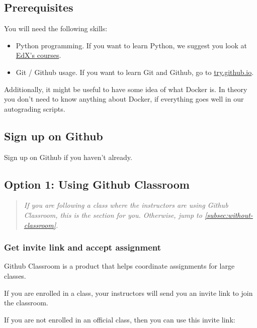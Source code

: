 

\subsection{Prerequisites}

You will need the following skills:

\begin{itemize}
	\item Python programming.
	      If you want to learn Python, we suggest you look at
	      \href{https://www.edx.org/learn/python}{EdX's courses}.
	\item Git / Github usage.
	      If you want to learn Git and Github, go to \href{https://try.github.io/}{try.github.io}.
\end{itemize}

Additionally, it might be useful to have some idea of what Docker is.
In theory you don't need to know anything about Docker, if everything goes well in our autograding scripts.

\subsection{Sign up on Github}

Sign up on Github if you haven't already.

\subsection{Option 1: Using Github Classroom}\label{subsec:with-classroom}

\begin{quote}
	\emph{
		If you are following a class where the instructors are using Github Classroom,
		this is the section for you.
		Otherwise, jump to \cref{subsec:without-classroom}.
	}
\end{quote}

\subsubsection{Get invite link and accept assignment}
Github Classroom is a product that helps coordinate assignments for large classes.
%

If you are enrolled in a class, your instructors will send you an invite link to join the classroom.

If you are not enrolled in an official class, then you can use this invite link:

